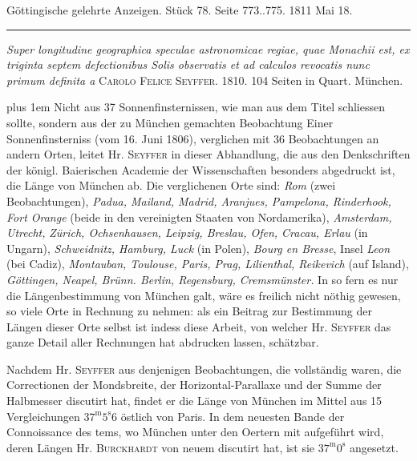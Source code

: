 \clearpage
{}
\hypertarget{native-538Seyffer}{}\label{native-538Seyffer}
\begin{center}\small Göttingische gelehrte Anzeigen. Stück 78. Seite 773..775. 1811 Mai 18.\\[3pt]\rule{.72\linewidth}{.3pt}\end{center}

\emph{Super longitudine geographica speculae astronomicae regiae, quae Monachii est, ex triginta septem defectionibus Solis observatis et ad calculos revocatis nunc primum definita a} \textsc{Carolo Felice Seyffer}. 1810. 104 Seiten in Quart. München.

{\rightskip=0pt plus 1em Nicht aus 37 Sonnenfinsternissen, wie man aus dem Titel schliessen sollte, sondern aus der zu München gemachten Beobachtung Einer Sonnenfinsterniss (vom 16. Juni 1806), verglichen mit 36 Beobachtungen an andern Orten, leitet Hr. \textsc{Seyffer} in dieser Abhandlung, die aus den Denkschriften der königl. Baierischen Academie der Wissenschaften besonders abgedruckt ist, die Länge von München ab. Die verglichenen Orte sind: \emph{Rom} (zwei Beobachtungen), \emph{Padua, Mailand, Madrid, Aranjues, Pampelona, Rinderhook, Fort Orange} (beide in den vereinigten Staaten von Nordamerika), \emph{Amsterdam, Utrecht,} \emph{Zürich, Ochsenhausen, Leipzig, Breslau, Ofen, Cracau, Erlau} (in Ungarn), \emph{Schweidnitz, Hamburg, Luck} (in Polen), \emph{Bourg en Bresse}, Insel \emph{Leon} (bei Cadiz), \emph{Montauban, Toulouse, Paris, Prag, Lilienthal, Reikevich} (auf Island), \emph{Göttingen, Neapel, Brünn. Berlin, Regensburg, Cremsmünster.} In so fern es nur die Längenbestimmung von München galt, wäre es freilich nicht nöthig gewesen, so viele Orte in Rechnung zu nehmen: als ein Beitrag zur Bestimmung der Längen dieser Orte selbst ist indess diese Arbeit, von welcher Hr. \textsc{Seyffer} das ganze Detail aller Rechnungen hat abdrucken lassen, schätzbar.\par}

Nachdem Hr. \textsc{Seyffer} aus denjenigen Beobachtungen, die vollständig waren, die Correctionen der Mondsbreite, der Horizontal-Parallaxe und der Summe der Halbmesser discutirt hat, findet er die Länge von München im Mittel aus 15 Vergleichungen $37^{\mathrm m}5^{\mathrm s}6$ östlich von Paris. In dem neuesten Bande der Connoissance des tems, wo München unter den Oertern mit aufgeführt wird, deren Längen Hr. \textsc{Burckhardt} von neuem discutirt hat, ist sie $37^{\mathrm m}0^{\mathrm s}$ angesetzt.

